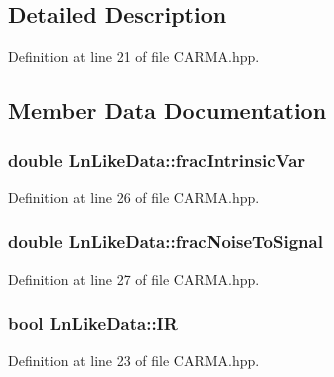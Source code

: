 \subsection{Detailed Description}


Definition at line 21 of file C\-A\-R\-M\-A.\-hpp.



\subsection{Member Data Documentation}
\hypertarget{struct_ln_like_data_a883ba357c5e5a7eff7fb9a25f130a0e7}{
\subsubsection[{frac\-Intrinsic\-Var}]{\setlength{\rightskip}{0pt plus 5cm}double Ln\-Like\-Data\-::frac\-Intrinsic\-Var}}\label{struct_ln_like_data_a883ba357c5e5a7eff7fb9a25f130a0e7}


Definition at line 26 of file C\-A\-R\-M\-A.\-hpp.

\hypertarget{struct_ln_like_data_a9d90bcfebe1eec966719b8c0febb7dc7}{
\subsubsection[{frac\-Noise\-To\-Signal}]{\setlength{\rightskip}{0pt plus 5cm}double Ln\-Like\-Data\-::frac\-Noise\-To\-Signal}}\label{struct_ln_like_data_a9d90bcfebe1eec966719b8c0febb7dc7}


Definition at line 27 of file C\-A\-R\-M\-A.\-hpp.

\hypertarget{struct_ln_like_data_af49dc41383840c47d9e03c154c510912}{
\subsubsection[{I\-R}]{\setlength{\rightskip}{0pt plus 5cm}bool Ln\-Like\-Data\-::\-I\-R}}\label{struct_ln_like_data_af49dc41383840c47d9e03c154c510912}


Definition at line 23 of file C\-A\-R\-M\-A.\-hpp.

